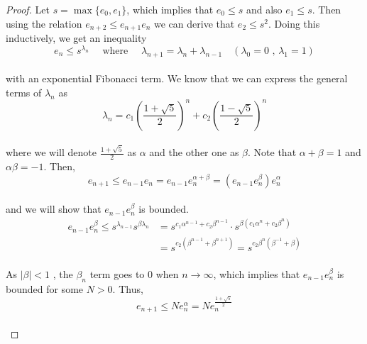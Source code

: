 \documentclass[paper=a4, fontsize=11pt]{scrartcl}
\begin{document}
\begin{proof}
	Let $s=\max\{e_0,e_1\}$, which implies that $e_0 \leq s$ and also $e_1 \leq s$. Then using the relation $ e_{n+2} \leq  e_{n+1} e_{n}$ we can derive that $e_2 \leq s^2$. Doing this inductively, we get an inequality \\
	
	\begin{equation}\nonumber
		e_n \leq s^{\lambda_n} \quad \text{ where } \quad \lambda_{n+1} = \lambda_n + \lambda_{n-1} \quad (\lambda_0 = 0 \text{ , } \lambda_1 = 1) 
	\end{equation}\\
	
	with an exponential Fibonacci term. We know that we can express the general terms of $\lambda_n$ as \\
	
	\begin{equation}\nonumber
		\lambda_n = c_1 \left(\frac{1+\sqrt{5}}{2}\right)^n + c_2 \left(\frac{1-\sqrt{5}}{2}\right)^n  
	\end{equation}\\
	
	where we will denote $\frac{1+\sqrt{5}}{2}$ as $\alpha$ and the other one as $\beta$. Note that $\alpha + \beta = 1$ and $\alpha \beta = -1$. Then, \\
	
	\begin{equation}\nonumber
		e_{n+1} \leq  e_{n-1} e_{n} =  e_{n-1} e_{n}^{\alpha + \beta} = (e_{n-1} e_n^\beta) e_n^\alpha
	\end{equation}\\
	
	and we will show that $e_{n-1} e_n^\beta$ is bounded.\\
	
	\begin{equation} \nonumber
		\begin{split}
		 e_{n-1} e_n^\beta \leq s^{\lambda_{n-1}} s^{\beta \lambda_n} &= s^{c_1 \alpha^{n-1} + c_2 \beta^{n-1}} \cdot s^{\beta(c_1 \alpha^{n} + c_2 \beta^{n})}\\ 
		 &= s^{c_2(\beta^{n-1}+\beta^{n+1})} = s^{c_2 \beta^n(\beta^{-1}+\beta)}
		\end{split}
	\end{equation}\\
	
	As $|\beta| < 1$ , the $\beta_n$ term goes to 0 when $n \to \infty$, which implies that $ e_{n-1} e_n^\beta$ is bounded for some $N>0$. Thus, \\
	
	\begin{equation}\nonumber
		e_{n+1} \leq N e_n^\alpha = N e_n^{\frac{1+\sqrt{5}}{2}}
	\end{equation}\\
 \end{proof}
\end{document}
